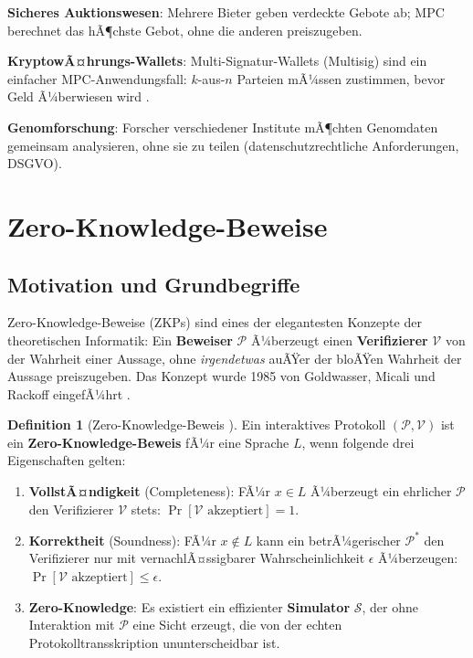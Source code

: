 ﻿\documentclass[a4paper,12pt]{scrreprt}
\theoremstyle{definition}
\newtheorem{definition}{Definition}[section]
\begin{document}
\textbf{Sicheres Auktionswesen}: Mehrere Bieter geben verdeckte Gebote ab; MPC berechnet das hÃ¶chste Gebot, ohne die anderen preiszugeben.

\textbf{KryptowÃ¤hrungs-Wallets}: Multi-Signatur-Wallets (Multisig) sind ein einfacher MPC-Anwendungsfall: $k$-aus-$n$ Parteien mÃ¼ssen zustimmen, bevor Geld Ã¼berwiesen wird \cite{Nak08}.

\textbf{Genomforschung}: Forscher verschiedener Institute mÃ¶chten Genomdaten gemeinsam analysieren, ohne sie zu teilen (datenschutzrechtliche Anforderungen, DSGVO).

\section{Zero-Knowledge-Beweise}

\subsection{Motivation und Grundbegriffe}

Zero-Knowledge-Beweise (ZKPs) sind eines der elegantesten Konzepte der theoretischen Informatik: Ein \textbf{Beweiser} $\mathcal{P}$ Ã¼berzeugt einen \textbf{Verifizierer} $\mathcal{V}$ von der Wahrheit einer Aussage, ohne \emph{irgendetwas} auÃŸer der bloÃŸen Wahrheit der Aussage preiszugeben. Das Konzept wurde 1985 von Goldwasser, Micali und Rackoff eingefÃ¼hrt \cite{GMR89}.

\begin{definition}[Zero-Knowledge-Beweis \cite{GMR89}]
Ein interaktives Protokoll $(\mathcal{P}, \mathcal{V})$ ist ein \textbf{Zero-Knowledge-Beweis} fÃ¼r eine Sprache $L$, wenn folgende drei Eigenschaften gelten:
\begin{enumerate}
    \item \textbf{VollstÃ¤ndigkeit} (Completeness): FÃ¼r $x \in L$ Ã¼berzeugt ein ehrlicher $\mathcal{P}$ den Verifizierer $\mathcal{V}$ stets: $\Pr[\mathcal{V} \text{ akzeptiert}] = 1$.
    \item \textbf{Korrektheit} (Soundness): FÃ¼r $x \notin L$ kann ein betrÃ¼gerischer $\mathcal{P}^*$ den Verifizierer nur mit vernachlÃ¤ssigbarer Wahrscheinlichkeit $\epsilon$ Ã¼berzeugen: $\Pr[\mathcal{V} \text{ akzeptiert}] \leq \epsilon$.
    \item \textbf{Zero-Knowledge}: Es existiert ein effizienter \textbf{Simulator} $\mathcal{S}$, der ohne Interaktion mit $\mathcal{P}$ eine Sicht erzeugt, die von der echten Protokolltransskription ununterscheidbar ist.
\end{enumerate}
\end{definition}
\end{document}
